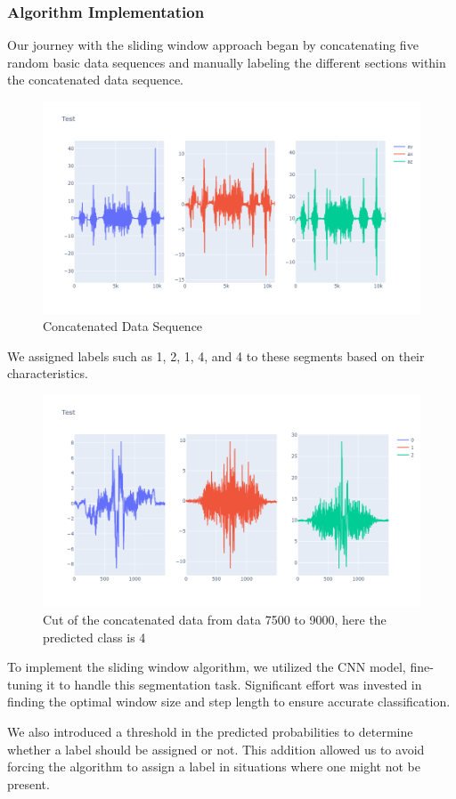 \subsubsection{Algorithm Implementation}
Our journey with the sliding window approach began by concatenating five random basic data sequences and manually labeling the different sections within the concatenated data sequence.
\begin{figure}[H]
    \centering
    \includegraphics[width=0.5\linewidth]{concat.png}
    \caption{Concatenated Data Sequence}
    \label{fig:enter-label}
\end{figure}

We assigned labels such as 1, 2, 1, 4, and 4 to these segments based on their characteristics.
\begin{figure}[H]
    \centering
    \includegraphics[width=0.5\linewidth]{petite.png}
    \caption{Cut of the concatenated data from data 7500 to 9000, here the predicted class is 4}
    \label{fig:enter-label}
\end{figure}

To implement the sliding window algorithm, we utilized the CNN model, fine-tuning it to handle this segmentation task. Significant effort was invested in finding the optimal window size and step length to ensure accurate classification.

We also introduced a threshold in the predicted probabilities to determine whether a label should be assigned or not. This addition allowed us to avoid forcing the algorithm to assign a label in situations where one might not be present.

